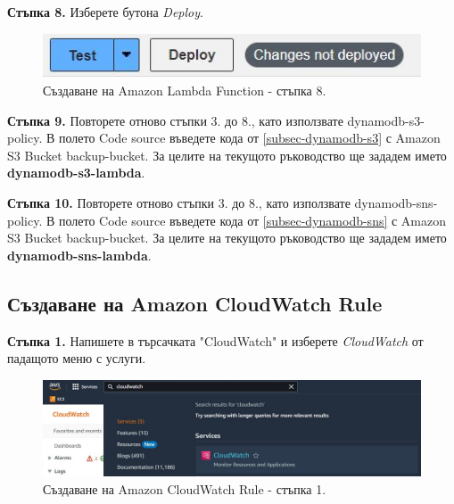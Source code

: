 \documentclass[12pt]{article}
\begin{document}
\noindent\textbf{Стъпка 8.} Изберете бутона \textit{Deploy}.
\begin{figure}[h!]
\centering
    \includegraphics[scale=0.7]{instructions/lambda/8.JPG}
  \caption{Създаване на Amazon Lambda Function - стъпка 8.}
\end{figure}

\noindent\textbf{Стъпка 9.} Повторете отново стъпки 3. до 8., като използвате dynamodb-s3-policy. В полето Code source въведете кода от \ref{subsec-dynamodb-s3} с Amazon S3 Bucket backup-bucket. За целите на текущото ръководство ще зададем името \textbf{dynamodb-s3-lambda}.

\noindent\textbf{Стъпка 10.} Повторете отново стъпки 3. до 8., като използвате dynamodb-sns-policy. В полето Code source въведете кода от \ref{subsec-dynamodb-sns} с Amazon S3 Bucket backup-bucket. За целите на текущото ръководство ще зададем името \textbf{dynamodb-sns-lambda}.

\clearpage
\pagebreak


\subsection{Създаване на Amazon CloudWatch Rule}
\noindent\textbf{Стъпка 1.} Напишете в търсачката "CloudWatch" и изберете \textit{CloudWatch} от падащото меню с услуги.
\begin{figure}[h!]
\centering
    \includegraphics[scale=0.4]{instructions/cloudwatch/1.JPG}
  \caption{Създаване на Amazon CloudWatch Rule - стъпка 1.}
\end{figure}
\end{document}

